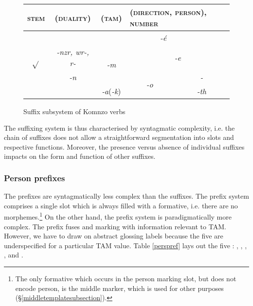 \begin{figure}[H]
\begin{center}%
	\begin{tabular}{|c|c|c|c|c|}
		\hline
		\textsc{stem}&\textsc{(duality)}&\multicolumn{1}{l|}{\textsc{(tam)}}&\multicolumn{2}{l|}{\textsc{(direction, person), number}}\\ \hline
		\multirow{4}{*}{$\sqrt{}$}&&\multicolumn{3}{c|}{\emph{-é}}\\ \cline{3-5}
		&\emph{-nzr, wr-, r-} & \multirow{2}{*}{\emph{-m}}&  \multicolumn{2}{c|}{\emph{-e}}\\\cline{4-5}
		&\emph{-n} &&\multirow{2}{*}{\emph{-o}} & \emph{-\Zero}\\\cline{3-3}\cline{5-5}
		&&\multicolumn{1}{c|}{\emph{-a}(\emph{-k})} & & \emph{-th}\\
		\hline
	\end{tabular}
\end{center}
\caption{Suffix subsystem of Komnzo verbs}\label{suffsubsys}
\end{figure}%

The suffixing system is thus characterised by syntagmatic complexity, i.e. the chain of suffixes does not allow a straightforward segmentation into slots and respective functions. Moreover, the presence versus absence of individual suffixes impacts on the form and function of other suffixes.

\subsubsection{Person prefixes} \label{personprefsection}

The  prefixes are syntagmatically less complex than the  suffixes. The prefix system comprises a single slot which is always filled with a formative, i.e. there are no  morphemes.\footnote{The only formative which occurs in the person marking slot, but does not encode person, is the middle marker, which is used for other purposes (\S{}\ref{middletemplatesubsection}).} On the other hand, the prefix system is paradigmatically more complex. The prefix fuses  and  marking with information relevant to TAM. However, we have to draw on abstract glossing labels because the five  are underspecified for a particular TAM value. Table \ref{perspref} lays out the five : \Alph, \Bet, \Betaone, \Betatwo, and \Gam.


